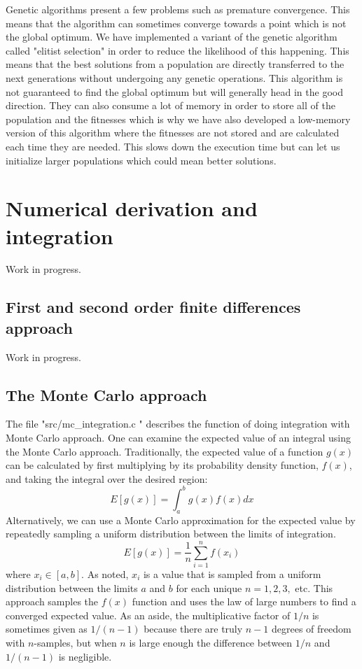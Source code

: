 \documentclass{book}
\begin{document}
Genetic algorithms present a few problems such as premature convergence. This means that the algorithm can sometimes converge towards a point which is not the global
optimum. We have implemented a variant of the genetic algorithm called "elitist selection" in order to reduce the likelihood of this happening. This means that the best solutions from a population are directly transferred
to the next generations without undergoing any genetic operations. This algorithm is not guaranteed to find the global optimum but will generally head in the good direction. They can also consume a lot of memory in order to store all of the population
and the fitnesses which is why we have also developed a low-memory version of this algorithm where the fitnesses are not stored and are calculated each time they are needed.
This slows down the execution time but can let us initialize larger populations which could mean better solutions.





\section{Numerical derivation and integration}

Work in progress.

\subsection{First and second order finite differences approach}

Work in progress.

\subsection{The Monte Carlo approach}

The file "src/mc\_integration.c " describes the function of doing integration with Monte Carlo approach.
One can examine the expected value of an integral using the Monte Carlo approach. Traditionally, the
expected value of a function $g(x)$ can be calculated by first multiplying by its probability density function,
$f(x)$, and taking the integral over the desired region:
$$
 E [ g(x) ] = \int_a^b g(x) f(x) dx
$$
Alternatively, we can use a Monte Carlo approximation for the expected value by repeatedly
sampling a uniform distribution between the limits of integration.
$$
 E [ g(x) ] = \frac{1}{n} \sum_{i=1}^n f(x_i)
$$
where $x_i \in [a, b]$. As noted, $x_i$  is a value that is sampled from a uniform distribution
between the limits $a$ and $b$ for each unique $n = 1,2,3,$ etc. This approach samples the $f(x)$
function and uses the law of large numbers to find a converged expected value.
As an aside, the multiplicative factor of $1/n$ is sometimes given as $1/(n-1)$ because there are
truly $n-1$ degrees of freedom with $n$-samples, but when $n$ is large enough the difference between
$1/n$ and $1/(n-1)$ is negligible.
\end{document}
